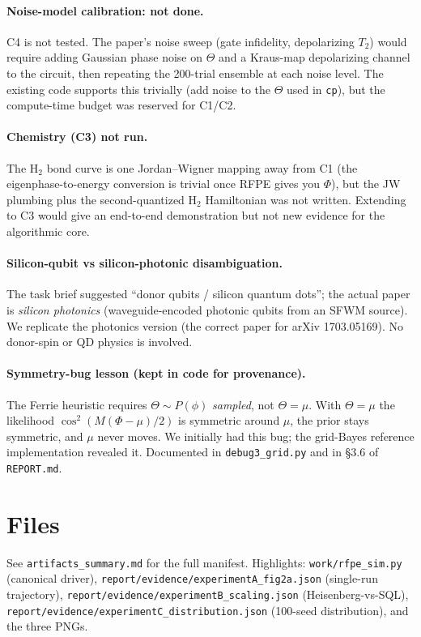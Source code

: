\documentclass[11pt]{article}
\begin{document}
\paragraph{Noise-model calibration: not done.}  C4 is not tested.  The paper's
noise sweep (gate infidelity, depolarizing $T_2$) would require adding
Gaussian phase noise on $\Theta$ and a Kraus-map depolarizing channel to the
circuit, then repeating the 200-trial ensemble at each noise level.  The
existing code supports this trivially (add noise to the $\Theta$ used in
\texttt{cp}), but the compute-time budget was reserved for C1/C2.

\paragraph{Chemistry (C3) not run.}  The H$_2$ bond curve is one Jordan--Wigner
mapping away from C1 (the eigenphase-to-energy conversion is trivial once RFPE
gives you $\Phi$), but the JW plumbing plus the second-quantized H$_2$
Hamiltonian was not written.  Extending to C3 would give an end-to-end
demonstration but not new evidence for the algorithmic core.

\paragraph{Silicon-qubit vs silicon-photonic disambiguation.}  The task brief
suggested ``donor qubits / silicon quantum dots''; the actual paper is
\emph{silicon photonics} (waveguide-encoded photonic qubits from an SFWM
source).  We replicate the photonics version (the correct paper for arXiv
1703.05169).  No donor-spin or QD physics is involved.

\paragraph{Symmetry-bug lesson (kept in code for provenance).}  The Ferrie
heuristic requires $\Theta\sim P(\phi)$ \emph{sampled}, not $\Theta=\mu$.  With
$\Theta=\mu$ the likelihood $\cos^2(M(\Phi-\mu)/2)$ is symmetric around $\mu$,
the prior stays symmetric, and $\mu$ never moves.  We initially had this bug;
the grid-Bayes reference implementation revealed it.  Documented in
\texttt{debug3\_grid.py} and in \S3.6 of \texttt{REPORT.md}.

\section{Files}
See \texttt{artifacts\_summary.md} for the full manifest.  Highlights:
\texttt{work/rfpe\_sim.py} (canonical driver),
\texttt{report/evidence/experimentA\_fig2a.json} (single-run trajectory),
\texttt{report/evidence/experimentB\_scaling.json} (Heisenberg-vs-SQL),
\texttt{report/evidence/experimentC\_distribution.json} (100-seed distribution),
and the three PNGs.
\end{document}

